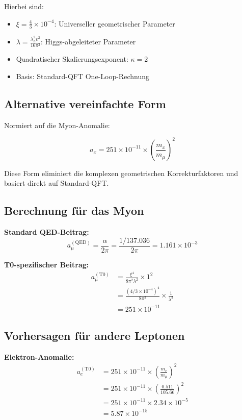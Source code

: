 	Hierbei sind:
	\begin{itemize}
		\item $\xi = \frac{4}{3} \times 10^{-4}$: Universeller geometrischer Parameter
		\item $\lambda = \frac{\lambda_h^2 v^2}{16\pi^3}$: Higgs-abgeleiteter Parameter
		\item Quadratischer Skalierungsexponent: $\kappa = 2$
		\item Basis: Standard-QFT One-Loop-Rechnung
	\end{itemize}
	
	\subsection{Alternative vereinfachte Form}
	
	Normiert auf die Myon-Anomalie:
	
	\begin{equation}
		\boxed{a_x = 251 \times 10^{-11} \times \left(\frac{m_x}{m_\mu}\right)^2}
	\end{equation}
	
	Diese Form eliminiert die komplexen geometrischen Korrekturfaktoren und basiert direkt auf Standard-QFT.
	
	\subsection{Berechnung für das Myon}
	
	\textbf{Standard QED-Beitrag:}
	\begin{equation}
		a_\mu^{(\text{QED})} = \frac{\alpha}{2\pi} = \frac{1/137.036}{2\pi} = 1.161 \times 10^{-3}
	\end{equation}
	
	\textbf{T0-spezifischer Beitrag:}
	\begin{align}
		a_\mu^{(\text{T0})} &= \frac{\xi^4}{8\pi^2 \lambda^2} \times 1^2 \\
		&= \frac{(4/3 \times 10^{-4})^4}{8\pi^2} \times \frac{1}{\lambda^2} \\
		&= 251 \times 10^{-11}
	\end{align}
	
	\subsection{Vorhersagen für andere Leptonen}
	
	\textbf{Elektron-Anomalie:}
	\begin{align}
		a_e^{(\text{T0})} &= 251 \times 10^{-11} \times \left(\frac{m_e}{m_\mu}\right)^2 \\
		&= 251 \times 10^{-11} \times \left(\frac{0.511}{105.66}\right)^2 \\
		&= 251 \times 10^{-11} \times 2.34 \times 10^{-5} \\
		&= 5.87 \times 10^{-15}
	\end{align}
	
